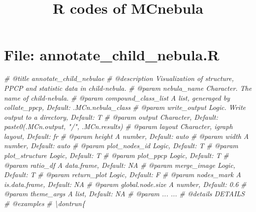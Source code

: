 \documentclass[
]{article}
\title{R codes of MCnebula}
\author{}
\date{\vspace{-2.5em}}
\newenvironment{Shaded}{\begin{snugshade}}{\end{snugshade}}
\newcommand{\CommentTok}[1]{\textcolor[rgb]{0.56,0.35,0.01}{\textit{#1}}}
\begin{document}
\maketitle

{
\setcounter{tocdepth}{3}
\tableofcontents
}
\hypertarget{file-annotate_child_nebula.r}{%
\section{File: annotate\_child\_nebula.R}\label{file-annotate_child_nebula.r}}

\begin{Shaded}
\begin{Highlighting}[]
\CommentTok{\#\textquotesingle{} @title annotate\_child\_nebulae}
\CommentTok{\#\textquotesingle{} @description Visualization of structure, PPCP and statistic data in child{-}nebula.}
\CommentTok{\#\textquotesingle{} @param nebula\_name Character. The name of child{-}nebula.}
\CommentTok{\#\textquotesingle{} @param compound\_class\_list A list, generaged by \textasciigrave{}collate\_ppcp\textasciigrave{}, Default: .MCn.nebula\_class}
\CommentTok{\#\textquotesingle{} @param write\_output Logic. Write output to a directory, Default: T}
\CommentTok{\#\textquotesingle{} @param output Character, Default: paste0(.MCn.output, "/", .MCn.results)}
\CommentTok{\#\textquotesingle{} @param layout Character, \textquotesingle{}igraph\textquotesingle{} layout, Default: \textquotesingle{}fr\textquotesingle{}}
\CommentTok{\#\textquotesingle{} @param height A number, Default: \textquotesingle{}auto\textquotesingle{}}
\CommentTok{\#\textquotesingle{} @param width A number, Default: \textquotesingle{}auto\textquotesingle{}}
\CommentTok{\#\textquotesingle{} @param plot\_nodes\_id Logic, Default: T}
\CommentTok{\#\textquotesingle{} @param plot\_structure Logic, Default: T}
\CommentTok{\#\textquotesingle{} @param plot\_ppcp Logic, Default: T}
\CommentTok{\#\textquotesingle{} @param ratio\_df A data.frame, Default: NA}
\CommentTok{\#\textquotesingle{} @param merge\_image Logic, Default: T}
\CommentTok{\#\textquotesingle{} @param return\_plot Logic, Default: F}
\CommentTok{\#\textquotesingle{} @param nodes\_mark A is.data.frame, Default: NA}
\CommentTok{\#\textquotesingle{} @param global.node.size A number, Default: 0.6}
\CommentTok{\#\textquotesingle{} @param theme\_args A list, Default: NA}
\CommentTok{\#\textquotesingle{} @param ... ...}
\CommentTok{\#\textquotesingle{} @details DETAILS}
\CommentTok{\#\textquotesingle{} @examples }
\CommentTok{\#\textquotesingle{} \textbackslash{}dontrun\{}

\end{Highlighting}
\end{Shaded}
\end{document}
